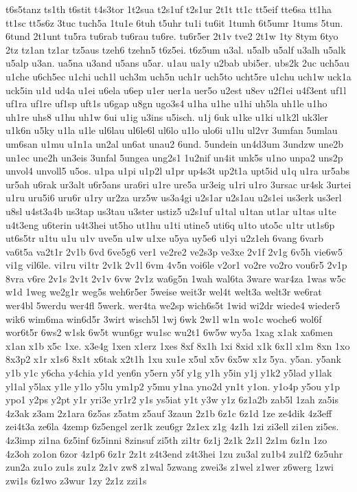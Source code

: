 {t6s5tanz
ts1th
t6stit
t4s3tor
1t2sua
t2s1uf
t2s1ur
2t1t
tt1c
tt5eif
tte6sa
tt1ha
tt1sc
tt5s6z
3tuc
tuch5a
1tu1e
6tuh
t5uhr
tu1i
tu6it
1tumh
6t5umr
1tums
5tun.
6tund
2t1unt
tu5ra
tu6rab
tu6rau
tu6re.
tu6r5er
2t1v
tve2
2t1w
1ty
8tym
6tyo
2tz
tz1an
tz1ar
tz5aus
tzeh6
tzehn5
t6z5ei.
t6z5um
u3al.
u5alb
u5alf
u3alh
u5alk
u5alp
u3an.
ua5na
u3and
u5ans
u5ar.
u1au
ua1y
u2bab
ubi5er.
ubs2k
2uc
uch5au
u1che
u6ch5ec
u1chi
uch1l
uch3m
uch5n
uch1r
uch5to
ucht5re
u1chu
uch1w
uck1a
uck5in
u1d
ud4a
u1ei
u6ela
u6ep
u1er
uer1a
uer5o
u2est
u8ev
u2f1ei
u4f3ent
uf1l
uf1ra
uf1re
uf1sp
uft1s
u6gap
u8gn
ugo3s4
u1ha
u1he
u1hi
uh5la
uh1le
u1ho
uh1re
uhs8
u1hu
uh1w
6ui
u1ig
u3ins
u5isch.
u1j
6uk
u1ke
u1ki
u1k2l
uk3ler
u1k6n
u5ky
u1la
u1le
ul6lau
ul6le6l
ul6lo
u1lo
ulo6i
u1lu
ul2vr
3umfan
5umlau
um6san
u1mu
u1n1a
un2al
un6at
unau2
6und.
5undein
un4d3um
3undzw
une2b
un1ec
une2h
un3eis
3unfal
5ungea
ung2s1
1u2nif
un4it
unk5s
u1no
unpa2
uns2p
unvol4
unvoll5
u5os.
u1pa
u1pi
u1p2l
u1pr
up4s3t
up2t1a
upt5id
u1q
u1ra
ur5abs
ur5ah
u6rak
ur3alt
u6r5ans
ura6ri
u1re
ure5a
ur3eig
u1ri
u1ro
3ursac
ur4sk
3urtei
u1ru
uru5i6
uru6r
u1ry
ur2za
urz5w
us3a4gi
u2s1ar
u2s1au
u2s1ei
us3erk
us3erl
u8sl
u4st3a4b
us3tap
us3tau
u3ster
ustiz5
u2s1uf
u1tal
u1tan
ut1ar
u1tas
u1te
u4t3eng
u6terin
u4t3hei
ut5ho
ut1hu
u1ti
utine5
uti6q
u1to
uto5c
u1tr
ut1s6p
ut6s5tr
u1tu
u1u
u1v
uve5n
u1w
u1xe
u5ya
uy5e6
u1yi
u2z1eh
6vang
6varb
va6t5a
va2t1r
2v1b
6vd
6ve5g6
ver1
ve2re2
ve2s3p
ve3xe
2v1f
2v1g
6v5h
vie6w5
vi1g
vil6le.
vi1ru
vi1tr
2v1k
2v1l
6vm
4v5n
voi6le
v2or1
vo2re
vo2ro
vou6r5
2v1p
8vra
v6re
2v1s
2v1t
2v1v
6vw
2v1z
wa6g5n
1wah
wal6ta
3ware
war4za
1was
w5c
w1d
1weg
we2g1r
weg5s
weh6r5er
5weise
weit3r
wel4t
welt3a
welt3r
we6rat
wer4bl
5werdu
wer4fl
5werk.
wer4ta
we2sp
wich6s5t
1wid
wi2dr
wiede4
wieder5
wik6
wim6ma
win6d5r
3wirt
wisch5l
1wj
6wk
2w1l
w1n
wo1c
woche6
wol6f
wor6t5r
6ws2
w1sk
6w5t
wun6gr
wu1sc
wu2t1
6w5w
wy5a
1xag
x1ak
xa6men
x1an
x1b
x5c
1xe.
x3e4g
1xen
x1erz
1xes
8xf
8x1h
1xi
8xid
x1k
6x1l
x1m
8xn
1xo
8x3p2
x1r
x1s6
8x1t
x6tak
x2t1h
1xu
xu1e
x5ul
x5v
6x5w
x1z
5ya.
y5an.
y5ank
y1b
y1c
y6cha
y4chia
y1d
yen6n
y5ern
y5f
y1g
y1h
y5in
y1j
y1k2
y5lad
y1lak
yl1al
y5lax
y1le
y1lo
y5lu
ym1p2
y5mu
y1na
yno2d
yn1t
y1on.
y1o4p
y5ou
y1p
ypo1
y2ps
y2pt
y1r
yri3e
yr1r2
y1s
ys5iat
y1t
y3w
y1z
6z1a2b
zab5l
1zah
za5is
4z3ak
z3am
2z1ara
6z5as
z5atm
z5auf
3zaun
2z1b
6z1c
6z1d
1ze
ze4dik
4z3eff
zei4t3a
ze6la
4zemp
6z5engel
zer1k
zeu6gr
2z1ex
z1g
4z1h
1zi
zi3ell
zi1en
zi5es.
4z3imp
zi1na
6z5inf
6z5inni
8zinsuf
zi5th
zi1tr
6z1j
2z1k
2z1l
2z1m
6z1n
1zo
4z3oh
zo1on
6zor
4z1p6
6z1r
2z1t
z4t3end
z4t3hei
1zu
zu3al
zu1b4
zu1f2
6z5uhr
zun2a
zu1o
zu1s
zu1z
2z1v
zw8
z1wal
5zwang
zwei3s
z1wel
z1wer
z6werg
1zwi
zwi1s
6z1wo
z3wur
1zy
2z1z
zzi1s}
 
